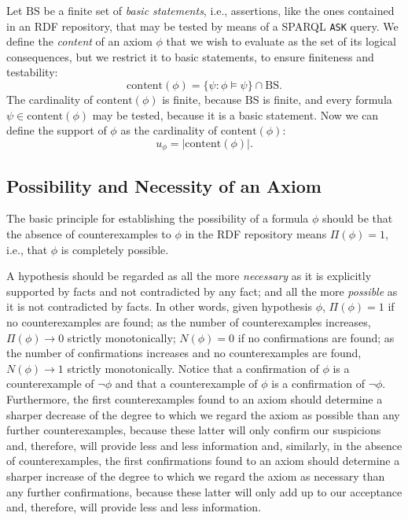 \documentclass{llncs}
\begin{document}
Let $\mathrm{BS}$ be a finite set of \emph{basic statements}, i.e.,
assertions, like the ones contained in an RDF repository,
that may be tested by means of a SPARQL \texttt{ASK} query.
We define the \emph{content} of an axiom $\phi$ that we wish to evaluate
as the set of its logical consequences, but we restrict it to basic statements, 
to ensure finiteness and testability:
\begin{equation}\label{eq:content}
  \mathrm{content}(\phi) = \{\psi : \phi \models \psi\} \cap \mathrm{BS}.
\end{equation}
The cardinality of $\mathrm{content}(\phi)$ is finite, because $\mathrm{BS}$ is finite,
and every formula $\psi \in \mathrm{content}(\phi)$ may be tested, because it is a basic statement.
Now we can define the support of $\phi$ as the cardinality of $\mathrm{content}(\phi)$:
\begin{equation}\label{eq:content2}
    u_\phi = |\mathrm{content}(\phi)|.
\end{equation}


\subsection{Possibility and Necessity of an Axiom}

The basic principle for establishing the possibility of a formula $\phi$ should be
that the absence of counterexamples to $\phi$ in the RDF repository means $\Pi(\phi) = 1$,
i.e., that $\phi$ is completely possible.

A hypothesis should be regarded as all the more
\emph{necessary} as it is explicitly supported by facts and not contradicted by any fact;
and all the more \emph{possible} as it is not contradicted by facts.
In other words, given hypothesis $\phi$, $\Pi(\phi) = 1$ if no counterexamples are found; 
as the number of counterexamples increases, $\Pi(\phi) \to 0$ strictly monotonically;
$N(\phi) = 0$ if no confirmations are found; as the number of confirmations increases
and no counterexamples are found, $N(\phi) \to 1$ strictly monotonically.
Notice that a confirmation of $\phi$ is a counterexample of $\neg\phi$
and that a counterexample of $\phi$ is a confirmation of $\neg\phi$.
Furthermore, the first counterexamples found to an axiom should determine a sharper decrease
of the degree to which we regard the axiom as possible than any further counterexamples,
because these latter will only confirm our suspicions and, therefore, will provide
less and less information and, similarly, in the absence of counterexamples,
the first confirmations found to an axiom should determine a sharper increase
of the degree to which we regard the axiom as necessary than any further confirmations,
because these latter will only add up to our acceptance and, therefore, will provide
less and less information.
\end{document}
